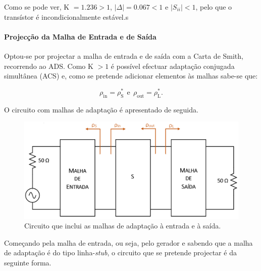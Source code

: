 \documentclass[11pt]{article}
\numberwithin{equation}{section}
\begin{document}
\vspace{1mm} 
Como se pode ver, K $= 1.236 > 1$, $\lvert \Delta \rvert = 0.067 < 1$ e $\lvert S_{ii} \rvert < 1$, pelo que o transístor é incondicionalmente estável.s

\paragraph{Projecção da Malha de Entrada e de Saída} \hspace{0pt} 

Optou-se por projectar a malha de entrada e de saída com a Carta de Smith, recorrendo ao ADS. Como K $ > 1$ é possível efectuar adaptação conjugada simultânea (ACS) e, como se pretende adicionar elementos às malhas sabe-se que:

\vspace{-3mm}
\begin{equation}
\rho_{\text{in}} = \rho_{\text{S}}^{*} ~~ \text{e} ~~ \rho_{\text{out}} = \rho_{\text{L}}^{*}.
\end{equation}

\vspace{1mm} 
O circuito com malhas de adaptação é apresentado de seguida.

\begin{figure}[H]
	\centering
	\includegraphics[keepaspectratio=true, scale=0.35]{teoricas/malhas}
	\vspace{-0.5em}
	\caption{Circuito que inclui as malhas de adaptação à entrada e à saída.}
	\vspace{-0.8em}
\end{figure}

Começando pela malha de entrada, ou seja, pelo gerador e sabendo que a malha de adaptação é do tipo linha-\textit{stub}, o circuito que se pretende projectar é da seguinte forma.
\end{document}
